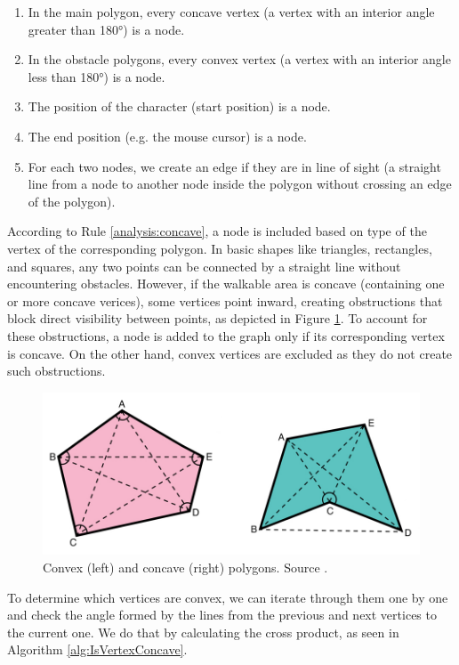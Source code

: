 \begin{enumerate}[label=\color{purple}\textbf{R{\arabic*}}]
  \item \label{analysis:concave} In the main polygon, every concave vertex (a vertex with an interior angle greater than 180°) is a node.
  \item \label{analysis:convex} In the obstacle polygons, every convex vertex (a vertex with an interior angle less than 180°) is a node.
  \item \label{analysis:start} The position of the character (start position) is a node.
  \item \label{analysis:end} The end position (e.g. the mouse cursor) is a node.
  \item \label{analysis:LOS} For each two nodes, we create an edge if they are in line of sight (a straight line from a node to another node inside the polygon without crossing an edge of the polygon). 
\end{enumerate}

According to Rule \ref{analysis:concave}, a node is included based on type of the vertex of the corresponding polygon. In basic shapes like triangles, rectangles, and squares, any two points can be connected by a straight line without encountering obstacles. However, if the walkable area is concave (containing one or more concave verices), some vertices point inward, creating obstructions that block direct visibility between points, as depicted in Figure \ref{fig:Polygons}. To account for these obstructions, a node is added to the graph only if its corresponding vertex is concave. On the other hand, convex vertices are excluded as they do not create such obstructions.

\begin{figure}[H]
\centering
\includegraphics[width=.8\linewidth]{img/polygons.png}
\caption{Convex (left) and concave (right) polygons. Source \cite{Polygons}.}
\label{fig:Polygons}
\end{figure}

To determine which vertices are convex, we can iterate through them one by one and check the angle formed by the lines from the previous and next vertices to the current one. We do that by calculating the cross product, as seen in Algorithm \ref{alg:IsVertexConcave}.

